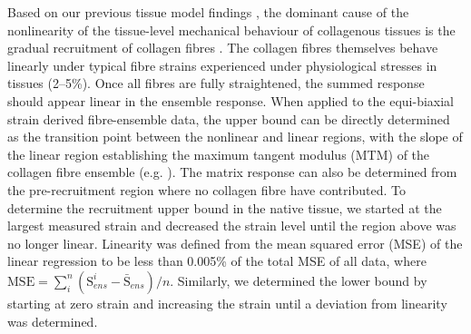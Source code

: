     Based on our previous tissue model findings \cite{sacks_incorporation_2003,fata_insights_2014,fan_simulation_2014,lee_presence_2015}, the dominant cause of the nonlinearity of the tissue-level mechanical behaviour of collagenous tissues is the gradual recruitment of collagen fibres \cite{lanir_constitutive_1983}. The collagen fibres themselves behave linearly under typical fibre strains experienced under physiological stresses in tissues (2–5\%). 
    Once all fibres are fully straightened, the summed response should appear linear in the ensemble response. When applied to the equi-biaxial strain derived fibre-ensemble data, the upper bound can be directly determined as the transition point between the nonlinear and linear regions, with the slope of the linear region establishing the maximum tangent modulus (MTM) of the collagen fibre ensemble (e.g. \cite{fata_insights_2014}). The matrix response can also be determined from the pre-recruitment region where no collagen fibre have contributed. To determine the recruitment upper bound in the native tissue, we started at the largest measured strain and decreased the strain level until the region above was no longer linear. Linearity was defined from the mean squared error (MSE) of the linear regression to be less than 0.005\% of the total MSE of all data, where $\mathrm{MSE} = \sum_i^n (\mathrm{S}^i_{ens} - \bar{\mathrm{S}}_{ens})/n$. Similarly, we determined the lower bound by starting at zero strain and increasing the strain until a deviation from linearity was determined.
    
